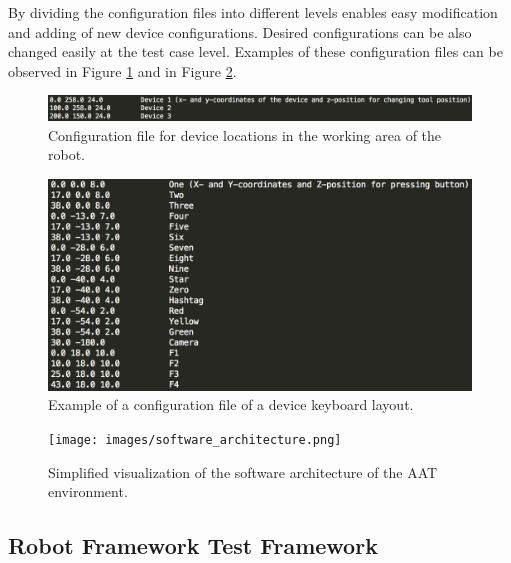 By dividing the configuration files into different levels enables easy modification and adding of new device configurations. Desired configurations can be also changed easily at the test case level. Examples of these configuration files can be observed in Figure \ref{fig:conf1} and in Figure \ref{fig:conf2}.

\begin{figure}[ht]
  \begin{center}
    \includegraphics[width=\textwidth]{images/conf1.png}
    \caption{Configuration file for device locations in the working area of the robot.}
    \label{fig:conf1}
  \end{center}
\end{figure}
\FloatBarrier

\begin{figure}[ht]
  \begin{center}
    \includegraphics[width=11	cm]{images/conf2.png}
    \caption{Example of a configuration file of a device keyboard layout.}
    \label{fig:conf2}
  \end{center}
\end{figure}
\FloatBarrier

\begin{figure}[ht]
  \begin{center}
    \texttt{[image: images/software\_architecture.png]}
    \caption{Simplified visualization of the software architecture of the AAT environment.}
    \label{fig:software_architecture}
  \end{center}
\end{figure}
\FloatBarrier

\subsection{Robot Framework Test Framework}
\label{subsection:Robot Framework and libraries}

